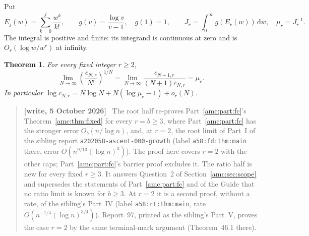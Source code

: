 \documentclass[11pt,letterpaper]{article}
\newtheorem{theorem}{Theorem}[section]
\theoremstyle{remark}\newtheorem{remark}[theorem]{Remark}
\newcommand{\dd}{\,\mathrm d}
\newenvironment{writenotedated}[1]{\par\smallskip\begin{quote}\small\textbf{[write, #1]}\ }{\end{quote}\smallskip}
\newcommand{\repopath}[1]{\nolinkurl{#1}}
\begin{document}
Put
\begin{equation}\label{amc:bm:eq:defconstant}
 E_j(w)=\sum_{k=0}^j\frac{w^k}{k!},\qquad
 g(v)=\frac{\log v}{v-1},\quad g(1)=1,\qquad
 J_r=\int_0^\infty g(E_r(w))\dd w,\quad \mu_r=J_r^{-1}.
\end{equation}
The integral is positive and finite: its integrand is continuous at zero and is $O_r(\log w/w^r)$ at infinity.

\begin{theorem}\label{amc:bm:thm:growth}
For every fixed integer $r\ge2$,
\begin{equation}\label{amc:bm:eq:mainlimits}
 \lim_{N\to\infty}\left(\frac{c_{N,r}}{N!}\right)^{1/N}
 =\lim_{N\to\infty}\frac{c_{N+1,r}}{(N+1)c_{N,r}}
 =\mu_r.
\end{equation}
In particular $\log c_{N,r}=N\log N+N(\log\mu_r-1)+o_r(N)$.
\end{theorem}

\begin{writenotedated}{5 October 2026}
The root half re-proves Part~\ref{amc:part:fc}'s Theorem~\ref{amc:thm:fixed} for every $r=b\ge3$, where Part~\ref{amc:part:fc} has the stronger error $O_b(n/\log n)$, and, at $r=2$, the root limit of Part~I of the sibling report \repopath{a202058-ascent-000-growth} (label \texttt{a58:fd:thm:main} there, error $O(n^{9/13}(\log n)^3)$). The proof here covers $r=2$ with the other caps; Part~\ref{amc:part:fc}'s barrier proof excludes it. The ratio half is new for every fixed $r\ge3$. It answers Question~2 of Section~\ref{amc:sec:scope} and supersedes the statements of Part~\ref{amc:part:fc} and of the Guide that no ratio limit is known for $b\ge3$. At $r=2$ it is a second proof, without a rate, of the sibling's Part~IV (label \texttt{a58:rt:thm:main}, rate $O(n^{-1/4}(\log n)^{3/4})$). Report~97, printed as the sibling's Part~V, proves the case $r=2$ by the same terminal-mark argument (Theorem~46.1 there).
\end{writenotedated}
\end{document}

